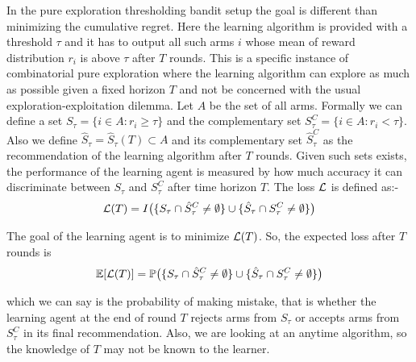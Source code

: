 	In the pure exploration thresholding bandit setup the goal is different than minimizing the cumulative regret. Here the learning algorithm is provided with a threshold $\tau$ and it has to output all such arms $i$ whose mean of reward distribution $r_{i}$ is above $\tau$ after $T$ rounds. This is a specific instance of combinatorial pure exploration where the learning algorithm can explore as much as possible given a fixed horizon $T$ and not be concerned with the usual exploration-exploitation dilemma. Let $A$ be the set of all arms. Formally we can define a set $S_{\tau}=\lbrace i\in A: r_{i}\geq \tau \rbrace$ and the complementary set $S_{\tau}^{C}=\lbrace i\in A: r_{i} < \tau \rbrace$. Also we define $\hat{S}_{\tau}=\hat{S}_{\tau}(T)\subset A$ and its complementary set $\hat{S}_{\tau}^{C}$ as the recommendation of the learning algorithm after $T$ rounds. Given such sets exists, the performance of the learning agent is measured by how much accuracy it can discriminate between $S_{\tau}$ and $S_{\tau}^{C}$ after time horizon $T$.  The loss $\mathcal{L}$ is defined as:-
\begin{align*}
\mathcal{L} (T) = I\big(\lbrace S_{\tau}\cap \hat{S}_{\tau}^{C}\neq \emptyset\rbrace    \cup    \lbrace\hat{S}_{\tau}\cap S_{\tau}^{C}\neq \emptyset\rbrace\big)
\end{align*}	
		
The goal of the learning agent is to minimize $\mathcal{L} (T)$. So, the expected loss after $T$ rounds is 
\begin{align*}
\mathbb{E}[\mathcal{L}(T)] = \mathbb{P}\big(\lbrace S_{\tau}\cap \hat{S}_{\tau}^{C} \neq \emptyset \rbrace  \cup   \lbrace \hat{S}_{\tau}\cap S_{\tau}^{C} \neq \emptyset\rbrace\big)
\end{align*}

which we can say is the probability of making mistake, that is whether the learning agent at the end of round $T$ rejects arms from $S_{\tau}$ or accepts arms from $S_{\tau}^{C}$ in its final recommendation. Also, we are looking at an anytime algorithm, so the knowledge of $T$ may not be known to the learner.


%

                                                                                                                                         